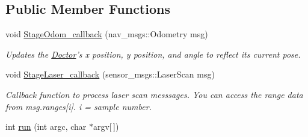 \subsection*{Public Member Functions}
\begin{DoxyCompactItemize}
\item 
void \hyperlink{classDoctor_a92b20f52198c6137d8858152cba77640}{Stage\-Odom\-\_\-callback} (nav\-\_\-msgs\-::\-Odometry msg)
\begin{DoxyCompactList}\small\item\em Updates the \hyperlink{classDoctor}{Doctor}'s x position, y position, and angle to reflect its current pose. \end{DoxyCompactList}\item 
void \hyperlink{classDoctor_ab0b46ba92bd2069733f304858b7e4495}{Stage\-Laser\-\_\-callback} (sensor\-\_\-msgs\-::\-Laser\-Scan msg)
\begin{DoxyCompactList}\small\item\em Callback function to process laser scan messsages. You can access the range data from msg.\-ranges\mbox{[}i\mbox{]}. i = sample number. \end{DoxyCompactList}\item 
\hypertarget{classDoctor_ac7ddd6ea1ee23cd67e8badcc29d2d7cd}{int \hyperlink{classDoctor_ac7ddd6ea1ee23cd67e8badcc29d2d7cd}{run} (int argc, char $\ast$argv\mbox{[}$\,$\mbox{]})}\label{classDoctor_ac7ddd6ea1ee23cd67e8badcc29d2d7cd}


\end{DoxyCompactItemize}

